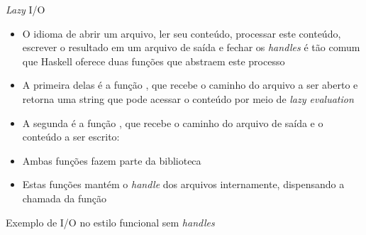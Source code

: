 \begin{frame}[fragile]{\textit{Lazy} I/O}

    \begin{itemize}
        \item O idioma de abrir um arquivo, ler seu conteúdo, processar este conteúdo, escrever
            o resultado em um arquivo de saída e fechar os \textit{handles} é tão comum que
            Haskell oferece duas funções que abstraem este processo

        \item A primeira delas é a função , que recebe o caminho do
            arquivo a ser aberto e retorna uma string que pode acessar o conteúdo por meio de
            \textit{lazy evaluation}


        \item A segunda é a função , que recebe o caminho do arquivo de
            saída e o conteúdo a ser escrito:


        \item Ambas funções fazem parte da biblioteca 

        \item Estas funções mantém o \textit{handle} dos arquivos internamente, dispensando a
            chamada da função 
    \end{itemize}

\end{frame}

\begin{frame}[fragile]{Exemplo de I/O no estilo funcional sem \textit{handles}}
\end{frame}

